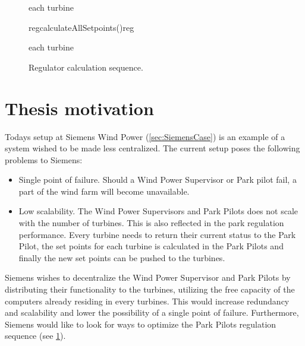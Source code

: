 \begin{figure}
	\centering
	\begin{sequencediagram} %
	
		\begin{sdblock}{each turbine}{}
		\end{sdblock}
		
		\begin{call}{reg}{calculateAllSetpoints()}{reg}{}
		\end{call}
	
		\begin{sdblock}{each turbine}{}
		\end{sdblock}
					
	\end{sequencediagram}

	\caption[Regulator calculation sequence]{
		\label{fig:dataComputationSequence} 
		\footnotesize{%
			Regulator calculation sequence.
		}
	}
\end{figure}

\section{Thesis motivation}
Todays setup at Siemens Wind Power (\cref{sec:SiemensCase}) is an example of a system wished to be made less centralized. The current setup poses the following problems to Siemens:  

\begin{itemize} 
	\item Single point of failure. Should a  Wind Power Supervisor or Park pilot fail, a part of the wind farm will become unavailable.
	\item Low scalability. The  Wind Power Supervisors and Park Pilots does not scale with the number of turbines. This is also reflected in the park regulation performance. Every turbine needs to return their current status to the Park Pilot, the set points for each turbine is calculated in the Park Pilots and finally the new set points can be pushed to the turbines.
\end{itemize}

Siemens wishes to decentralize the Wind Power Supervisor and Park Pilots by distributing their functionality to the turbines, utilizing the free capacity of the computers already residing in every turbines. This would increase redundancy and scalability and lower the possibility of a single point of failure. Furthermore, Siemens would like to look for ways to optimize the Park Pilots regulation sequence (see \cref{fig:dataComputationSequence}).


